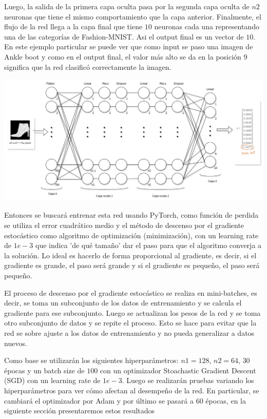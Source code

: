 \documentclass[aps,prl,reprint,groupedaddress]{revtex4-2}
\newenvironment{Figura}
  {\par\medskip\noindent\minipage{\linewidth}}
  {\endminipage\par\medskip}
\begin{document}
Luego, la salida de la primera capa oculta pasa por la segunda capa oculta de $n2$
neuronas que tiene el mismo comportamiento que la capa anterior. Finalmente,
el flujo de la red llega a la capa final que tiene $10$ neuronas cada una 
representando una de las categorías de Fashion-MNIST. Asi el output final es un 
vector de $10$. En este ejemplo particular se puede ver que como input se paso 
una imagen de Ankle boot y como en el output final, el valor más alto se da en 
la posición $9$ significa que la red clasificó correctamente la imagen.

\begin{Figura}
  \centering
  \includegraphics[width=1\textwidth]{figs/arq_model.png}
  \label{fig-red}
\end{Figura}

Entonces se buscará entrenar esta red usando PyTorch, como función de perdida 
se utiliza el error cuadrático medio y el método de descenso 
por el gradiente estocástico como algoritmo de optimización (minimización), 
con un learning rate de $1e-3$ que indica 'de qué tamaño' dar el paso 
para que el algoritmo converja a la solución. Lo ideal es hacerlo de forma 
proporcional al gradiente, es decir, si el gradiente es grande, el paso será
grande y si el gradiente es pequeño, el paso será pequeño.

El proceso de descenso por el gradiente estocástico se realiza en mini-batches,
es decir, se toma un subconjunto de los datos de entrenamiento y se calcula el
gradiente para ese subconjunto. Luego se actualizan los pesos de la red y se
toma otro subconjunto de datos y se repite el proceso. Esto se hace para evitar
que la red se sobre ajuste a los datos de entrenamiento y no pueda generalizar
a datos nuevos.

Como base se utilizarán los siguientes hiperparámetros: $n1=128$, $n2=64$, 
$30$ épocas y un batch size de $100$ con un optimizador 
Stoachastic Gradient Descent (SGD) con un learning rate de $1e-3$. Luego se 
realizarán pruebas variando los hiperparámetros para ver cómo afectan al 
desempeño de la red. En particular, se cambiará el optimizador por Adam y 
por último se pasará a $60$ épocas, en la siguiente sección presentaremos
estos resultados
\end{document}
